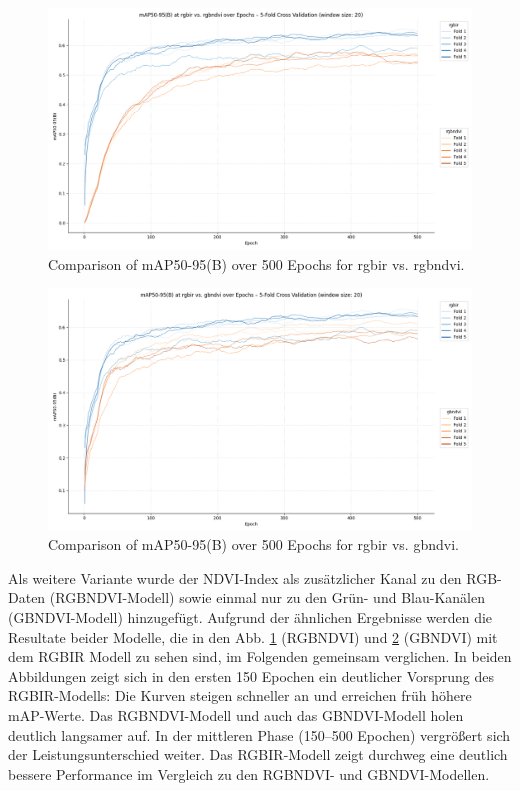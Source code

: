 \begin{figure}[h] 
    \centering %
    \includegraphics[width=1\textwidth]{images/rgbir/mAP@50-95/rgbir_vs_rgbndvi_full.png} %
    \caption{Comparison of mAP50-95(B) over 500 Epochs for rgbir vs. rgbndvi.} %
    \label{fig:map_rgbir_rgbndvi} %
\end{figure}

\begin{figure}[h] 
    \centering %
    \includegraphics[width=1\textwidth]{images/rgbir/mAP@50-95/rgbir_vs_gbndvi_full.png} %
    \caption{Comparison of mAP50-95(B) over 500 Epochs for rgbir vs. gbndvi.} %
    \label{fig:map_rgbir_gbndvi} %
\end{figure}

Als weitere Variante wurde der NDVI-Index als zusätzlicher Kanal zu den RGB-Daten (RGBNDVI-Modell) sowie einmal nur zu den Grün- und Blau-Kanälen (GBNDVI-Modell) hinzugefügt. Aufgrund der ähnlichen Ergebnisse werden die Resultate beider Modelle, die in den Abb. \ref{fig:map_rgbir_rgbndvi} (RGBNDVI) und \ref{fig:map_rgbir_gbndvi} (GBNDVI) mit dem RGBIR Modell zu sehen sind, im Folgenden gemeinsam verglichen. In beiden Abbildungen zeigt sich in den ersten 150 Epochen ein deutlicher Vorsprung des RGBIR-Modells: Die Kurven steigen schneller an und erreichen früh höhere mAP-Werte. Das RGBNDVI-Modell und auch das GBNDVI-Modell holen deutlich langsamer auf. In der mittleren Phase (150–500 Epochen) vergrößert sich der Leistungsunterschied weiter. Das RGBIR-Modell zeigt durchweg eine deutlich bessere Performance im Vergleich zu den RGBNDVI- und GBNDVI-Modellen. 


